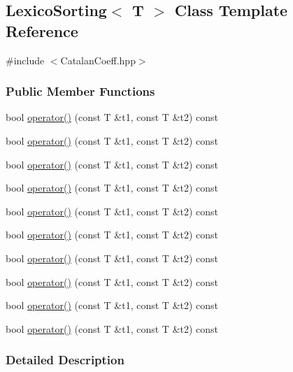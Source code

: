 \hypertarget{classLexicoSorting}{\subsection{\-Lexico\-Sorting$<$ \-T $>$ \-Class \-Template \-Reference}
\label{classLexicoSorting}
}


{\ttfamily \#include $<$\-Catalan\-Coeff.\-hpp$>$}

\subsubsection*{\-Public \-Member \-Functions}
\begin{DoxyCompactItemize}
\item 
bool \hyperlink{classLexicoSorting_ab411e7952cbda7be9138cf5704dfb453}{operator()} (const \-T \&t1, const \-T \&t2) const 
\item 
bool \hyperlink{classLexicoSorting_ab411e7952cbda7be9138cf5704dfb453}{operator()} (const \-T \&t1, const \-T \&t2) const 
\item 
bool \hyperlink{classLexicoSorting_ab411e7952cbda7be9138cf5704dfb453}{operator()} (const \-T \&t1, const \-T \&t2) const 
\item 
bool \hyperlink{classLexicoSorting_ab411e7952cbda7be9138cf5704dfb453}{operator()} (const \-T \&t1, const \-T \&t2) const 
\item 
bool \hyperlink{classLexicoSorting_ab411e7952cbda7be9138cf5704dfb453}{operator()} (const \-T \&t1, const \-T \&t2) const 
\item 
bool \hyperlink{classLexicoSorting_ab411e7952cbda7be9138cf5704dfb453}{operator()} (const \-T \&t1, const \-T \&t2) const 
\item 
bool \hyperlink{classLexicoSorting_ab411e7952cbda7be9138cf5704dfb453}{operator()} (const \-T \&t1, const \-T \&t2) const 
\item 
bool \hyperlink{classLexicoSorting_ab411e7952cbda7be9138cf5704dfb453}{operator()} (const \-T \&t1, const \-T \&t2) const 
\item 
bool \hyperlink{classLexicoSorting_ab411e7952cbda7be9138cf5704dfb453}{operator()} (const \-T \&t1, const \-T \&t2) const 
\item 
bool \hyperlink{classLexicoSorting_ab411e7952cbda7be9138cf5704dfb453}{operator()} (const \-T \&t1, const \-T \&t2) const 
\end{DoxyCompactItemize}


\subsubsection{\-Detailed \-Description}
